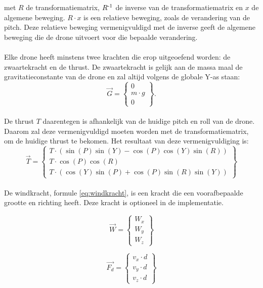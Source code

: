 met \(R\) de transformatiematrix, \(R\textsuperscript{-1}\) de inverse van de transformatiematrix en \(x\) de algemene beweging.  \(R \cdot x \)  is een relatieve beweging, zoals de verandering van de pitch. Deze relatieve beweging vermenigvuldigd met de inverse geeft de algemene beweging die de drone uitvoert voor die bepaalde verandering.
\\
\\
Elke drone heeft minstens twee krachten die erop uitgeoefend worden: de zwaartekracht en de thrust. De zwaartekracht is gelijk aan de massa maal de gravitatieconstante van de drone en zal altijd volgens de globale Y-as staan: \\
\begin{equation*} 
\vec{G} =
\begin{Bmatrix}
0 \\
m \cdot g \\
0 
\end{Bmatrix}.
\end{equation*} 
\\
De thrust \(T\) daarentegen is afhankelijk van de huidige pitch en roll van de drone. Daarom zal deze vermenigvuldigd moeten worden met de transformatiematrix, om de huidige thrust te bekomen. Het resultaat van deze vermenigvuldiging is: 
\begin{equation*} 
\vec{T} = 
\begin{Bmatrix}
T\cdot(\sin(P)\sin(Y) - \cos(P)\cos(Y)\sin(R))\\ 
T\cdot\cos(P)\cos(R) \\
T\cdot(\cos(Y)\sin(P) + \cos(P)\sin(R)\sin(Y))
\end{Bmatrix}
\end{equation*}
\\
De windkracht, formule \ref{eq:windkracht}, is een kracht die een voorafbepaalde grootte en richting heeft. Deze kracht is optioneel in de implementatie. \\
\begin{figure}[h]
	\centering
	\begin{minipage}{.49\textwidth}
		\begin{equation}
		\vec{W} = 
		\begin{Bmatrix}
		W_x \\
		W_y \\
		W_z 
		\end{Bmatrix}
		\label{eq:windkracht}
		\end{equation}
	\end{minipage}
	\begin{minipage}{.49\textwidth}
		\begin{equation}
		\vec{F_d} = 
		\begin{Bmatrix}
		v_x \cdot d \\
		v_y \cdot d \\
		v_z \cdot d
		\end{Bmatrix}
		\label{eq:wrijvingskracht}
		\end{equation}
	\end{minipage}
\end{figure}

